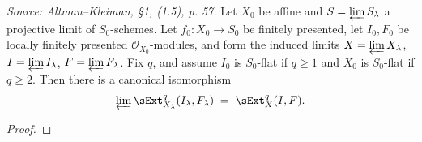 \begin{lemma}
  \label{lem:ext_limit}
  \textit{Source: Altman--Kleiman, §1, (1.5), p. 57.}
  Let $X_0$ be affine and $S = \varprojlim S_\lambda$ a projective limit of
  $S_0$-schemes. Let $f_0 : X_0 \to S_0$ be finitely presented, let $I_0, F_0$ be
  locally finitely presented $\mathcal{O}_{X_0}$-modules, and form the induced
  limits $X = \varprojlim X_\lambda$, $I = \varprojlim I_\lambda$,
  $F = \varprojlim F_\lambda$. Fix $q$, and assume $I_0$ is $S_0$-flat if
  $q \geq 1$ and $X_0$ is $S_0$-flat if $q \geq 2$. Then there is a canonical
  isomorphism
  \[
    \varprojlim \sExt^q_{X_\lambda}(I_\lambda, F_\lambda)
      \;=\; \sExt^q_X(I,F).
  \]
  \begin{proof}

\end{proof}
\end{lemma}
